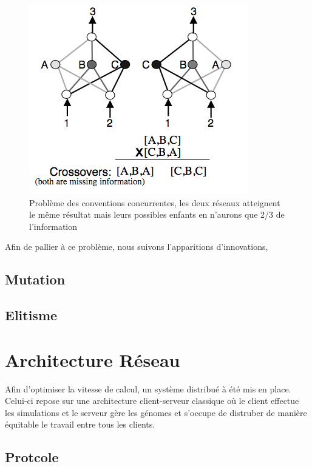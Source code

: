 \documentclass{article}
\begin{document}
\begin{figure}[h]
\begin{center}
	\includegraphics[scale=0.5]{competingconventions.png}
	\caption{Problème des conventions concurrentes, les deux réseaux atteignent le même résultat mais leurs possibles enfants en n'aurons que 2/3 de l'information \cite{neatpaper}}
\end{center}
\end{figure}
\newpage

Afin de pallier à ce problème, nous suivons l'apparitions d'innovations, 

\subsection{Mutation}
\subsection{Elitisme}

\section{Architecture Réseau}

Afin d'optimiser la vitesse de calcul, un système distribué à été mis en place. Celui-ci repose sur une architecture client-serveur classique où le client effectue les simulations et le serveur gère les génomes et s'occupe de distruber de manière équitable le travail entre tous les clients.\\

\subsection{Protcole}
\end{document}

